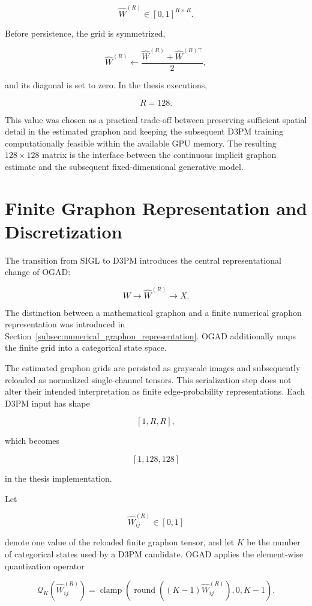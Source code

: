 \[
\widehat{W}^{(R)}
\in
[0,1]^{R\times R}.
\]

Before persistence, the grid is symmetrized,

\[
\widehat{W}^{(R)}
\leftarrow
\frac{
\widehat{W}^{(R)}
+
\widehat{W}^{(R)\top}
}{2},
\]

and its diagonal is set to zero. In the thesis executions,

\[
R=128.
\]

This value was chosen as a practical trade-off between preserving sufficient spatial detail in the estimated graphon and keeping the subsequent D3PM training computationally feasible within the available GPU memory. 
The resulting \(128\times128\) matrix is the interface between the continuous implicit graphon estimate and the subsequent fixed-dimensional generative model.


\section{Finite Graphon Representation and Discretization}
\label{sec:method_graphon_discretization}

The transition from SIGL to D3PM introduces the central representational change of OGAD:

\[
W
\longrightarrow
\widehat{W}^{(R)}
\longrightarrow
X.
\]

The distinction between a mathematical graphon and a finite numerical graphon representation was introduced in Section~\ref{subsec:numerical_graphon_representation}. OGAD additionally maps the finite grid into a categorical state space.

The estimated graphon grids are persisted as grayscale images and subsequently reloaded as normalized single-channel tensors. This serialization step does not alter their intended interpretation as finite edge-probability representations. Each D3PM input has shape

\[
[1,R,R],
\]

which becomes

\[
[1,128,128]
\]

in the thesis implementation.

Let

\[
\widehat{W}^{(R)}_{ij}\in[0,1]
\]

denote one value of the reloaded finite graphon tensor, and let \(K\) be the number of categorical states used by a D3PM candidate. OGAD applies the element-wise quantization operator

\[
\mathcal{Q}_K
\left(
\widehat{W}^{(R)}_{ij}
\right)
=
\operatorname{clamp}
\left(
\operatorname{round}
\left(
(K-1)\widehat{W}^{(R)}_{ij}
\right),
0,
K-1
\right).
\]

